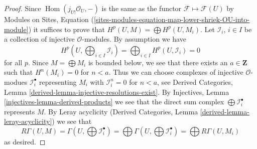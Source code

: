 \documentclass[10pt,a4paper]{amsart}
\theoremstyle{plain}
\theoremstyle{definition}
\theoremstyle{remark}
\numberwithin{equation}{subsection}
\def\Hom{\mathop{\mathrm{Hom}}\nolimits}
\begin{document}
\begin{proof}
Since $\Hom(j_{U!}\mathcal{O}_U, -)$ is the same as the functor
$\mathcal{F} \mapsto \mathcal{F}(U)$ by
Modules on Sites, Equation
(\ref{sites-modules-equation-map-lower-shriek-OU-into-module}) it suffices
to prove that $H^p(U, M) = \bigoplus H^p(U, M_i)$.
Let $\mathcal{I}_i$, $i \in I$ be a collection of injective
$\mathcal{O}$-modules. By assumption we have
$$
H^p(U, \bigoplus\nolimits_{i \in I} \mathcal{I}_i) =
\bigoplus\nolimits_{i \in I} H^p(U, \mathcal{I}_i) = 0
$$
for all $p$. Since $M = \bigoplus M_i$ is bounded below, we
see that there exists an $a \in \mathbf{Z}$ such that $H^n(M_i) = 0$
for $n < a$. Thus we can choose complexes of injective $\mathcal{O}$-modues
$\mathcal{I}_i^\bullet$ representing $M_i$
with $\mathcal{I}_i^n = 0$ for $n < a$, see
Derived Categories, Lemma \ref{derived-lemma-injective-resolutions-exist}.
By Injectives, Lemma \ref{injectives-lemma-derived-products}
we see that the direct sum complex $\bigoplus \mathcal{I}_i^\bullet$
represents $M$. By Leray acyclicity
(Derived Categories, Lemma \ref{derived-lemma-leray-acyclicity})
we see that
$$
R\Gamma(U, M) = \Gamma(U, \bigoplus \mathcal{I}_i^\bullet) =
\bigoplus \Gamma(U, \bigoplus \mathcal{I}_i^\bullet) =
\bigoplus R\Gamma(U, M_i)
$$
as desired.
\end{proof}
\end{document}
